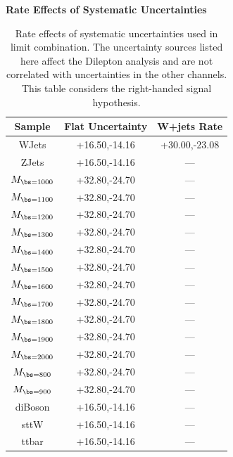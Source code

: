 \begin{table}[htcb]
\begin{center}
\begin{small}
\bf{Rate Effects of Systematic Uncertainties}\\
\begin{tabular}{|c||cc|}
\hline\hline 
Sample & Flat Uncertainty & W+jets Rate\\ 
\hline 
WJets & +16.50,-14.16 & +30.00,-23.08 \\ 
\hline 
ZJets & +16.50,-14.16 & --- \\ 
\hline 
$M_{\bs=1000}$ & +32.80,-24.70 & --- \\ 
\hline 
$M_{\bs=1100}$ & +32.80,-24.70 & --- \\ 
\hline 
$M_{\bs=1200}$ & +32.80,-24.70 & --- \\ 
\hline 
$M_{\bs=1300}$ & +32.80,-24.70 & --- \\ 
\hline 
$M_{\bs=1400}$ & +32.80,-24.70 & --- \\ 
\hline 
$M_{\bs=1500}$ & +32.80,-24.70 & --- \\
\hline 
$M_{\bs=1600}$ & +32.80,-24.70 & --- \\ 
\hline 
$M_{\bs=1700}$ & +32.80,-24.70 & --- \\ 
\hline 
$M_{\bs=1800}$ & +32.80,-24.70 & --- \\ 
\hline 
$M_{\bs=1900}$ & +32.80,-24.70 & --- \\ 
\hline 
$M_{\bs=2000}$ & +32.80,-24.70 & --- \\ 
\hline 
$M_{\bs=800}$ & +32.80,-24.70 & --- \\ 
\hline 
$M_{\bs=900}$ & +32.80,-24.70 & --- \\ 
\hline 
diBoson & +16.50,-14.16 & --- \\ 
\hline 
sttW & +16.50,-14.16 & --- \\ 
\hline 
ttbar & +16.50,-14.16 & --- \\ 
\hline
\end{tabular}
\caption{Rate effects of systematic uncertainties used in limit combination.  The uncertainty sources listed here affect the Dilepton analysis and are not correlated with uncertainties in the other channels.  This table considers the right-handed signal hypothesis.}
\label{table:bsRsysDi}
\end{small}
\end{center}
\end{table}

\clearpage


